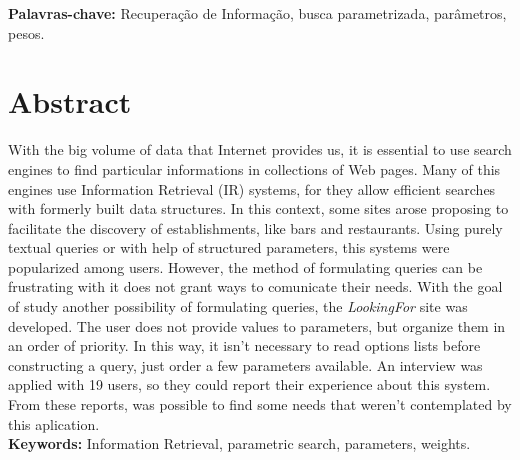 \documentclass[11pt,oneside,a4paper]{book}
\begin{document}
\noindent \textbf{Palavras-chave:} Recuperação de Informação, busca parametrizada, parâmetros, pesos.

 \chapter*{Abstract}

With the big volume of data that Internet provides us, it is essential to use search engines to find particular informations in collections of Web pages. Many of this engines use Information Retrieval (IR) systems, for they allow efficient searches with formerly built data structures. In this context, some sites arose proposing to facilitate the discovery of establishments, like bars and restaurants. Using purely textual queries or with help of structured parameters, this systems were popularized among users. However, the method of formulating queries can be frustrating with it does not grant ways to comunicate their needs. With the goal of study another possibility of formulating queries, the \emph{LookingFor} site was developed. The user does not provide values to parameters, but organize them in an order of priority. In this way, it isn’t necessary to read options lists before constructing a query, just order a few parameters available. An interview was applied with 19 users, so they could report their experience about this system. From these reports, was possible to find some needs that weren’t contemplated by this aplication. \\

\noindent \textbf{Keywords:} Information Retrieval, parametric search, parameters, weights.

\tableofcontents    %

\end{document}
